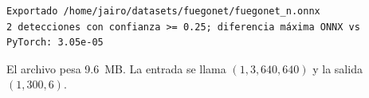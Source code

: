 \begin{resultado}
\begin{lstlisting}
Exportado /home/jairo/datasets/fuegonet/fuegonet_n.onnx
2 detecciones con confianza >= 0.25; diferencia máxima ONNX vs PyTorch: 3.05e-05
\end{lstlisting}
El archivo pesa 9.6~MB. La entrada se llama  $(1,3,640,640)$ y la
salida  $(1,300,6)$.
\end{resultado}

